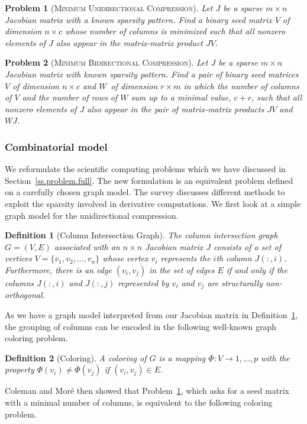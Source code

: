 \documentclass[12pt, twoside,a4paper,toc=bibliography]{scrbook}
\newtheorem{problem}{Problem}
\newtheorem{definition}{Definition}
\newcommand{\secref}[1]{Section~\protect\ref{#1}}
\newcommand{\defref}[1]{Definition~\protect\ref{#1}}
\newcommand{\col}{\ensuremath{c}}
\newcommand{\row}{\ensuremath{r}}
\newcommand{\MinUniCom}{\textsc{Minimum Unidirectional Compression}}
\newcommand{\MinBidCom}{\textsc{Minimum Bidirectional Compression}}
\begin{document}
\begin{problem}[\MinUniCom]
\label{p.seed.uni} Let $J$ be a sparse ${m\times n}$ Jacobian matrix with a known sparsity
pattern. Find a binary seed matrix $V$ of dimension $n\times \col$
whose number of columns is minimized
such that all nonzero elements of $J$ also appear in
the matrix-matrix product $JV$.
\end{problem}

\begin{problem}[\MinBidCom]
\label{p.seed.bid} Let $J$ be a sparse ${m\times n}$ Jacobian matrix with known sparsity
pattern. Find a pair of binary seed matrices $V$ of dimension $n\times \col$ and $W$~of
dimension $\row \times m$ in which the number of columns of $V$ and the number of rows of $W$ sum up to a minimal value, $\col + \row$, such that all nonzero elements of $J$ also appear in
the pair of matrix-matrix products $JV$ and $WJ$.
\end{problem}

\subsubsection{Combinatorial model}
\label{s.modeling.full}
We reformulate the scientific computing problems which
we have discussed in \secref{ss.problem.full}.
The new formulation is an equivalent problem defined on a
carefully chosen graph model. The survey \cite{Gebremedhin05whatcolor}
discusses different methods
to exploit the sparsity involved in derivative computations.
We first look at a simple graph model for the unidirectional compression.
%
\begin{definition}[Column Intersection Graph]
\label{d:cig}
The column intersection graph $G = (V,E)$ associated with an $n \times n$ Jacobian matrix $J$
consists of a set of vertices $V=\{v_1, v_2, \dots, v_n\}$ whose vertex $v_i$ represents
the $i$th column $J(:,i)$. Furthermore, there is an edge $(v_i,v_j)$ in the set of edges
$E$ if and only if the columns $J(:,i)$ and $J(:,j)$ represented by $v_i$ and $v_j$ 
are structurally non-orthogonal.
\end{definition}

As we have a graph model interpreted from our Jacobian matrix in \defref{d:cig},
the grouping of columns can be encoded in the following well-known graph coloring problem.
%
\begin{definition}[Coloring]
A coloring of $G$ is a mapping $\Phi : V \to {1, \dots, p}$ with the property
$\Phi(v_i)\neq \Phi(v_j)$ if $(v_i,v_j) \in E$.
\end{definition}
%
Coleman and Mor\'{e} \cite{Coleman1983EoS} then showed that Problem~\ref{p.seed.uni}, which
asks for a seed matrix with a minimal number of columns, is equivalent to the following
coloring problem.
\end{document}
